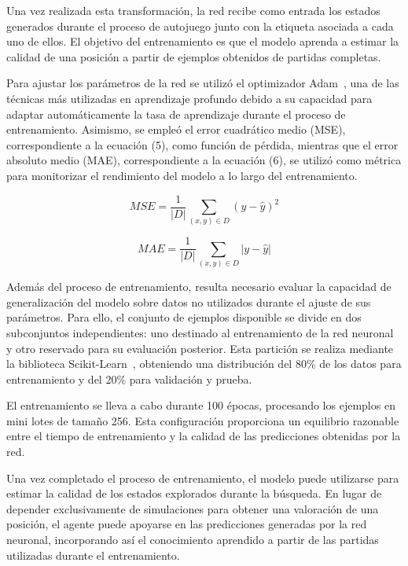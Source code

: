 \documentclass[conference,a4paper]{IEEEtran}
\begin{document}
Una vez realizada esta transformación, la red recibe como entrada los estados generados durante el proceso de autojuego junto con la etiqueta asociada a cada uno de ellos. 
El objetivo del entrenamiento es que el modelo aprenda a estimar la calidad de una posición a partir de ejemplos obtenidos de partidas completas. 

Para ajustar los parámetros de la red se utilizó el optimizador Adam~\cite{b13}, una de las técnicas más utilizadas en aprendizaje profundo debido a su capacidad para adaptar automáticamente la tasa de aprendizaje durante el proceso de entrenamiento. 
Asimismo, se empleó el error cuadrático medio (MSE), correspondiente a la ecuación (5), como función de pérdida, mientras que el error absoluto medio (MAE), correspondiente a la ecuación (6), se utilizó como métrica para monitorizar el rendimiento del modelo a lo largo del entrenamiento. 

\begin{equation}
  \label{eq:mse}
  MSE=\frac{1}{|D|}\sum_{(x,y)\in D}(y-\hat{y})^{2} 
\end{equation}

\begin{equation}
  \label{eq:mae}
  MAE=\frac{1}{|D|}\sum_{(x,y)\in D}|y-\hat{y}| 
\end{equation}

Además del proceso de entrenamiento, resulta necesario evaluar la capacidad de generalización del modelo sobre datos no utilizados durante el ajuste de sus parámetros. 
Para ello, el conjunto de ejemplos disponible se divide en dos subconjuntos independientes: uno destinado al entrenamiento de la red neuronal y otro reservado para su evaluación posterior. 
Esta partición se realiza mediante la biblioteca Scikit-Learn~\cite{b14}, obteniendo una distribución del 80\% de los datos para entrenamiento y del 20\% para validación y prueba. 

El entrenamiento se lleva a cabo durante 100 épocas, procesando los ejemplos en mini lotes de tamaño 256. Esta configuración proporciona un equilibrio razonable entre el tiempo de entrenamiento y la calidad de las predicciones obtenidas por la red. 

Una vez completado el proceso de entrenamiento, el modelo puede utilizarse para estimar la calidad de los estados explorados durante la búsqueda. 
En lugar de depender exclusivamente de simulaciones para obtener una valoración de una posición, el agente puede apoyarse en las predicciones generadas por la red neuronal, incorporando así el conocimiento aprendido a partir de las partidas utilizadas durante el entrenamiento. 
\end{document}
